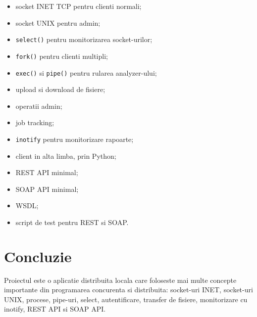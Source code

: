 \documentclass[12pt,a4paper]{article}
\begin{document}
\begin{itemize}
    \item socket INET TCP pentru clienti normali;
    \item socket UNIX pentru admin;
    \item \texttt{select()} pentru monitorizarea socket-urilor;
    \item \texttt{fork()} pentru clienti multipli;
    \item \texttt{exec()} si \texttt{pipe()} pentru rularea analyzer-ului;
    \item upload si download de fisiere;
    \item operatii admin;
    \item job tracking;
    \item \texttt{inotify} pentru monitorizare rapoarte;
    \item client in alta limba, prin Python;
    \item REST API minimal;
    \item SOAP API minimal;
    \item WSDL;
    \item script de test pentru REST si SOAP.
\end{itemize}

\section{Concluzie}

Proiectul este o aplicatie distribuita locala care foloseste mai multe concepte importante din programarea concurenta si distribuita: socket-uri INET, socket-uri UNIX, procese, pipe-uri, select, autentificare, transfer de fisiere, monitorizare cu inotify, REST API si SOAP API.
\end{document}
